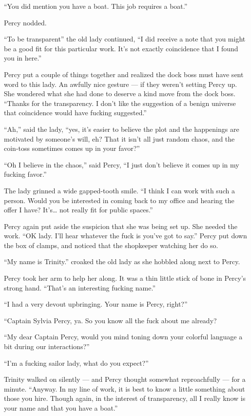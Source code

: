 \documentclass[
]{scrbook}
\begin{document}
``You did mention you have a boat. This job requires a boat.''

Percy nodded.

``To be transparent'' the old lady continued, ``I did receive a note
that you might be a good fit for this particular work. It's not exactly
coincidence that I found you in here.''

Percy put a couple of things together and realized the dock boss must
have sent word to this lady. An awfully nice gesture --- if they weren't
setting Percy up. She wondered what she had done to deserve a kind move
from the dock boss. ``Thanks for the transparency. I don't like the
suggestion of a benign universe that coincidence would have fucking
suggested.''

``Ah,'' said the lady, ``yes, it's easier to believe the plot and the
happenings are motivated by someone's will, eh? That it isn't all just
random chaos, and the coin-toss sometimes comes up in your favor?''

``Oh I believe in the chaos,'' said Percy, ``I just don't believe it
comes up in my fucking favor.''

The lady grinned a wide gapped-tooth smile. ``I think I can work with
such a person. Would you be interested in coming back to my office and
hearing the offer I have? It's\ldots{} not really fit for public
spaces.''

Percy again put aside the suspicion that she was being set up. She
needed the work. ``OK lady. I'll hear whatever the fuck is you've got to
say.'' Percy put down the box of clamps, and noticed that the shopkeeper
watching her do so.

``My name is Trinity.'' croaked the old lady as she hobbled along next
to Percy.

Percy took her arm to help her along. It was a thin little stick of bone
in Percy's strong hand. ``That's an interesting fucking name.''

``I had a very devout upbringing. Your name is Percy, right?''

``Captain Sylvia Percy, ya. So you know all the fuck about me already?

``My dear Captain Percy, would you mind toning down your colorful
language a bit during our interactions?''

``I'm a fucking sailor lady, what do you expect?''

Trinity walked on silently --- and Percy thought somewhat reproachfully
--- for a minute. ``Anyway. In my line of work, it is best to know a
little something about those you hire. Though again, in the interest of
transparency, all I really know is your name and that you have a boat.''
\end{document}
